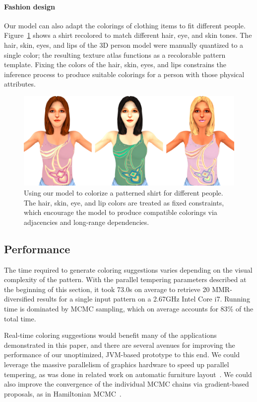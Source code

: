\paragraph{Fashion design}
Our model can also adapt the colorings of clothing items to fit different people. Figure~\ref{fig:fashion} shows a shirt recolored to match different hair, eye, and skin tones. The hair, skin, eyes, and lips of the 3D person model were manually quantized to a single color; the resulting texture atlas functions as a recolorable pattern template. Fixing the colors of the hair, skin, eyes, and lips constrains the inference process to produce suitable colorings for a person with those physical attributes.

\begin{figure}[ht!]
\centering
\includegraphics[width=\columnwidth]{figs/fashion/composite}
\caption{Using our model to colorize a patterned shirt for different people. The hair, skin, eye, and lip colors are treated as fixed constraints, which encourage the model to produce compatible colorings via adjacencies and long-range dependencies.}
\label{fig:fashion}
\end{figure}

\subsection{Performance}

The time required to generate coloring suggestions varies depending on the visual complexity of the pattern. With the parallel tempering parameters described at the beginning of this section, it took 73.0s on average to retrieve 20 MMR-diversified results for a single input pattern on a 2.67GHz Intel Core i7. Running time is dominated by MCMC sampling, which on average accounts for 83\% of the total time.

Real-time coloring suggestions would benefit many of the applications demonstrated in this paper, and there are several avenues for improving the performance of our unoptimized, JVM-based prototype to this end. We could leverage the massive parallelism of graphics hardware to speed up parallel tempering, as was done in related work on automatic furniture layout~\cite{MerrellFurnitureLayout}. We could also improve the convergence of the individual MCMC chains via gradient-based proposals, as in Hamiltonian MCMC~\cite{HamiltonianMCMC}.
